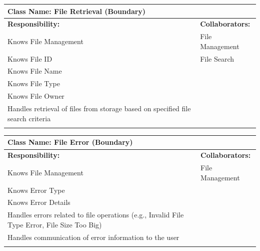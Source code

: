 \documentclass[]{article}
\begin{document}
\begin{itemize}
	\begin{table}[ht]
		\centering
		\begin{tabular}{|p{7cm}|p{7cm}|}
		\hline 
		 \multicolumn{2}{|l|}{\textbf{Class Name:} File Retrieval (Boundary)} \\
		\hline
		\textbf{Responsibility:} & \textbf{Collaborators:} \\
		\hline
			Knows File Management & File Management \\
			Knows File ID & File Search \\
			Knows File Name &\\
			Knows File Type &\\
			Knows File Owner &\\
			Handles retrieval of files from storage based on specified file search criteria &\\
		\vspace{0.1in} & \\
		\hline
		\end{tabular}
	\end{table}

	\begin{table}[ht]
		\centering
		\begin{tabular}{|p{7cm}|p{7cm}|}
		\hline 
		 \multicolumn{2}{|l|}{\textbf{Class Name:} File Error (Boundary)} \\
		\hline
		\textbf{Responsibility:} & \textbf{Collaborators:} \\
		\hline
			Knows File Management & File Management \\
			Knows Error Type &\\
			Knows Error Details &\\
			Handles errors related to file operations (e.g., Invalid File Type Error, File Size Too Big) &\\
			Handles communication of error information to the user &\\
		\vspace{0.1in} & \\
		\hline
		\end{tabular}
	\end{table}


\end{itemize}
\end{document}
